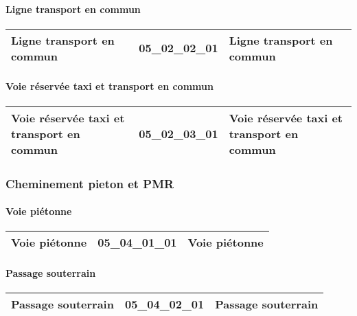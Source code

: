 \documentclass[12pt,titlepage,oneside]{book}
\begin{document}
\paragraph{Ligne transport en commun}
\noindent
\vspace{\baselineskip}

\renewcommand{\arraystretch}{1.2}
\begin{supertabular}{|p{10cm}|c|p{15cm}|}
 Ligne transport en commun & 05\_02\_02\_01 & Ligne transport en commun\\
\hline
\end{supertabular}


\paragraph{Voie réservée taxi et transport en commun}
\noindent
\vspace{\baselineskip}

\renewcommand{\arraystretch}{1.2}
\begin{supertabular}{|p{10cm}|c|p{15cm}|}
 Voie réservée taxi et transport en commun & 05\_02\_03\_01 & Voie réservée taxi et transport en commun\\
\hline
\end{supertabular}

\subsubsection{\large Cheminement pieton et PMR}
\paragraph{Voie piétonne}
\noindent
\vspace{\baselineskip}

\renewcommand{\arraystretch}{1.2}
\begin{supertabular}{|p{10cm}|c|p{15cm}|}
 Voie piétonne & 05\_04\_01\_01 & Voie piétonne\\
\hline
\end{supertabular}


\paragraph{Passage souterrain}
\noindent
\vspace{\baselineskip}

\renewcommand{\arraystretch}{1.2}
\begin{supertabular}{|p{10cm}|c|p{15cm}|}
 Passage souterrain & 05\_04\_02\_01 & Passage souterrain\\
\hline
\end{supertabular}
\end{document}
